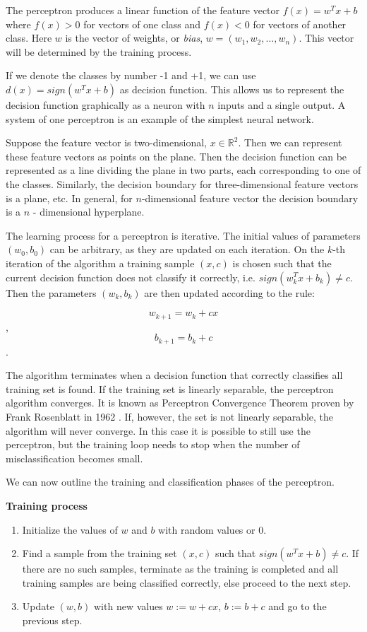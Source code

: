 \documentclass[12pt]{report}
\newcommand{\re}{\mathbb{R}}
\begin{document}
The perceptron produces a linear function of the feature vector $f(x) = w^Tx + b$ where $f(x) > 0$ for vectors of one class and $f(x) < 0$ for vectors of another class. Here $w$ is the vector of weights, or \textit{bias}, $w = (w_1, w_2, \dots, w_n)$. This vector will be determined by the training process.

If we denote the classes by number -1 and +1, we can use $d(x) = sign(w^Tx + b)$ as decision function. This allows us to represent the decision function graphically as a neuron with $n$ inputs and a single output. A system of one perceptron is an example of the simplest neural network.

Suppose the feature vector is two-dimensional, $x \in \re^2$. Then we can represent these feature vectors as points on the plane. Then the decision function can be represented as a line dividing the plane in two parts, each corresponding to one of the classes. Similarly, the decision boundary for three-dimensional feature vectors is a plane, etc. In general, for $n$-dimensional feature vector the decision boundary is a $n$ - dimensional hyperplane.

The learning process for a perceptron is iterative. The initial values of parameters $(w_0, b_0)$ can be arbitrary, as they are updated on each iteration. On the $k$-th iteration of the algorithm a training sample $(x, c)$ is chosen such that the current decision function does not classify it correctly, i.e. $sign(w_k^Tx + b_k) \ne c$. Then the parameters $(w_k, b_k)$ are then updated according to the rule:

$$w_{k+1} = w_k + cx$$,
$$b_{k+1} = b_k + c$$.

The algorithm terminates when a decision function that correctly classifies all training set is found. If the training set is linearly separable, the perceptron algorithm converges. It is known as Perceptron Convergence Theorem proven by Frank Rosenblatt in 1962 \cite{Cristianini}. If, however, the set is not linearly separable, the algorithm will never converge. In this case it is possible to still use the perceptron, but the training loop needs to stop when the number of misclassification becomes small.

We can now outline the training and classification phases of the perceptron.

\textbf{Training process}

\begin{enumerate}
	\item Initialize the values of $w$ and $b$ with random values or 0.
	\item Find a sample from the training set $(x, c)$ such that $sign(w^Tx + b) \ne c$. If there are no such samples, terminate as the training is completed and all training samples are being classified correctly, else proceed to the next step.
	\item Update $(w, b)$ with new values $w := w + cx$, $b := b + c$ and go to the previous step.
\end{enumerate}
\end{document}
